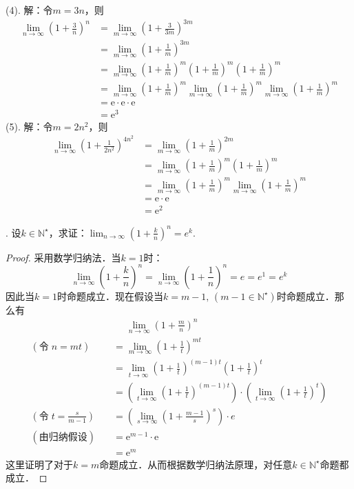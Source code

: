 (4). 解：令$m=3n$，则
\begin{align}
    \lim_{n\to\infty}\left(1+\frac{3}{n}\right)^n &= \lim_{m\to\infty}\left(1+\frac{3}{3m}\right)^{3m} \\
    &= \lim_{m\to\infty}\left(1+\frac{1}{m}\right)^{3m} \\
    &= \lim_{m\to\infty}\left(1+\frac{1}{m}\right)^{m}\left(1+\frac{1}{m}\right)^{m}\left(1+\frac{1}{m}\right)^{m} \\
    &= \lim_{m\to\infty}\left(1+\frac{1}{m}\right)^{m} \lim_{m\to\infty}\left(1+\frac{1}{m}\right)^{m}\lim_{m\to\infty}\left(1+\frac{1}{m}\right)^{m} \\
    &= \mathrm{e}\cdot\mathrm{e}\cdot\mathrm{e}\\
    &=\mathrm{e}^3
\end{align}
(5). 解：令$m=2n^2$，则
\begin{align}
    \lim_{n\to\infty} \left(1+\frac{1}{2n^2}\right)^{4n^2} &= \lim_{m\to\infty}\left(1+\frac{1}{m}\right)^{2m} \\
    &= \lim_{m\to\infty}\left(1+\frac{1}{m}\right)^{m} \left(1+\frac{1}{m}\right)^{m} \\
    &= \lim_{m\to\infty}\left(1+\frac{1}{m}\right)^{m} \lim_{m\to\infty}\left(1+\frac{1}{m}\right)^{m} \\
    &=\mathrm{e} \cdot \mathrm{e} \\
    &=\mathrm{e}^2
\end{align}

. 设$k \in \mathbb{N}^\star$，求证：$\displaystyle \lim_{n \to \infty} (1+\frac{k}{n})^n = e^k$.
\begin{proof}
采用数学归纳法．当$k=1$时：
\begin{equation}
    \lim_{n\to \infty}(1+\frac{k}{n})^n = \lim_{n \to \infty}(1+\frac{1}{n})^n = e = e^1 = e^k
\end{equation}
因此当$k=1$时命题成立．现在假设当$k = m-1, \, (m-1\in \mathbb{N}^\star)$时命题成立．那么有
\begin{align}
    &\phantom{=} \lim_{n \to \infty} (1+\frac{m}{n})^n \\
    (\text{令} \; n = m t) \quad & = \lim_{m \to \infty} (1 + \frac{1}{t})^{m t} \\
    &= \lim_{t \to \infty} (1+\frac{1}{t})^{(m-1) t} (1+\frac{1}{t})^t \\
    &= \left( \lim_{t \to \infty} (1+\frac{1}{t})^{(m-1) t} \right) \cdot \left( \lim_{t \to \infty} (1+\frac{1}{t})^t \right)\\ 
    (\text{令} \; t = \frac{s}{m-1}) \quad &= \left( \lim_{s \to \infty} (1 + \frac{m-1}{s})^s \right) \cdot e \\
    (\text{由归纳假设} ) \quad &= \mathrm{e}^{m-1} \cdot \mathrm{e} \\
    &= \mathrm{e}^m
\end{align}
这里证明了对于$k = m$命题成立．从而根据数学归纳法原理，对任意$k \in \mathbb{N}^\star$命题都成立．
\end{proof}


